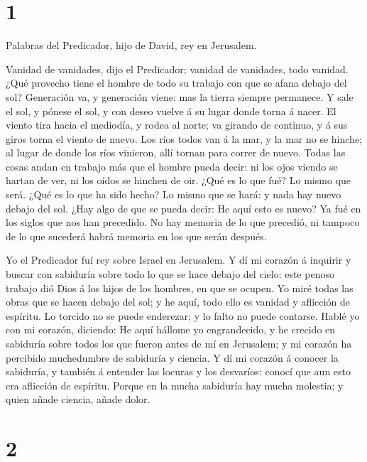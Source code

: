 \hypertarget{section}{%
\section{1}\label{section}}

 Palabras del Predicador, hijo de David, rey en Jerusalem.

 Vanidad de vanidades, dijo el Predicador; vanidad de
vanidades, todo vanidad.  ¿Qué provecho tiene el hombre de
todo su trabajo con que se afana debajo del sol?  Generación
va, y generación viene: mas la tierra siempre permanece.  Y
sale el sol, y pónese el sol, y con deseo vuelve á su lugar donde torna
á nacer.  El viento tira hacia el mediodía, y rodea al
norte; va girando de continuo, y á sus giros torna el viento de nuevo.
 Los ríos todos van á la mar, y la mar no se hinche; al
lugar de donde los ríos vinieron, allí tornan para correr de nuevo.
 Todas las cosas andan en trabajo más que el hombre pueda
decir: ni los ojos viendo se hartan de ver, ni los oídos se hinchen de
oir.  ¿Qué es lo que fué? Lo mismo que será. ¿Qué es lo que
ha sido hecho? Lo mismo que se hará: y nada hay nuevo debajo del sol.
 ¿Hay algo de que se pueda decir: He aquí esto es nuevo? Ya
fué en los siglos que nos han precedido.  No hay memoria de
lo que precedió, ni tampoco de lo que sucederá habrá memoria en los que
serán después.

 Yo el Predicador fuí rey sobre Israel en Jerusalem.
 Y dí mi corazón á inquirir y buscar con sabiduría sobre
todo lo que se hace debajo del cielo: este penoso trabajo dió Dios á los
hijos de los hombres, en que se ocupen.  Yo miré todas las
obras que se hacen debajo del sol; y he aquí, todo ello es vanidad y
aflicción de espíritu.  Lo torcido no se puede enderezar; y
lo falto no puede contarse.  Hablé yo con mi corazón,
diciendo: He aquí hállome yo engrandecido, y he crecido en sabiduría
sobre todos los que fueron antes de mí en Jerusalem; y mi corazón ha
percibido muchedumbre de sabiduría y ciencia.  Y dí mi
corazón á conocer la sabiduría, y también á entender las locuras y los
desvaríos: conocí que aun esto era aflicción de espíritu. 
Porque en la mucha sabiduría hay mucha molestia; y quien añade ciencia,
añade dolor.

\hypertarget{section-1}{%
\section{2}\label{section-1}}

